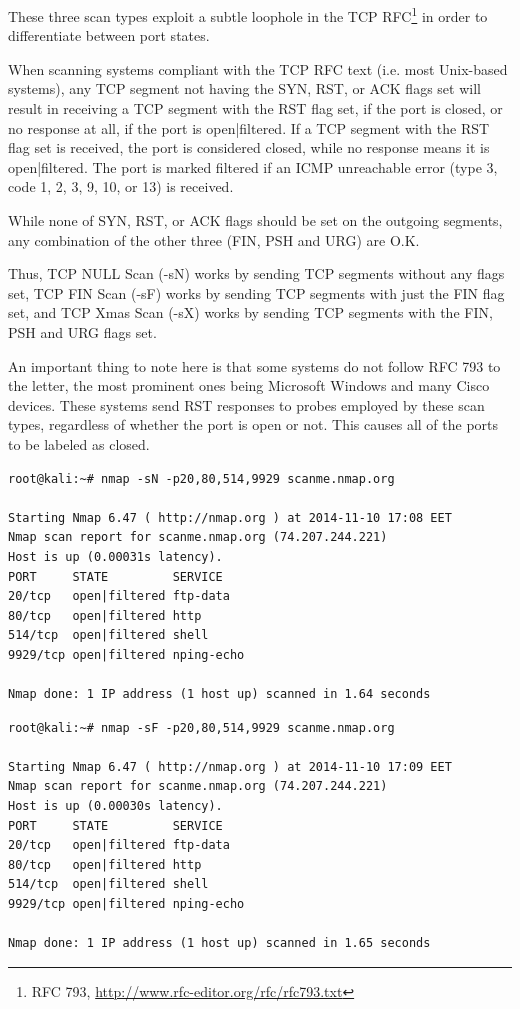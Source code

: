 \documentclass[a4paper,oneside,12pt]{book}
\begin{document}
These three scan types exploit a subtle loophole in the TCP RFC\footnote{RFC 793, \url{http://www.rfc-editor.org/rfc/rfc793.txt}} in order to differentiate between port states. 

When scanning systems compliant with the TCP RFC text (i.e. most Unix-based systems), any TCP segment not having the SYN, RST, or ACK flags set will result in receiving a TCP segment with the RST flag set, if the port is closed, or no response at all, if the port is open|filtered. If a TCP segment with the RST flag set is received, the port is considered closed, while no response means it is open|filtered. The port is marked filtered if an ICMP unreachable error (type 3, code 1, 2, 3, 9, 10, or 13) is received. 

While none of SYN, RST, or ACK flags should be set on the outgoing segments, any combination of the other three (FIN, PSH and URG) are O.K.

Thus, TCP NULL Scan (-sN) works by sending TCP segments without any flags set, TCP FIN Scan (-sF) works by sending TCP segments with just the FIN flag set, and TCP Xmas Scan (-sX) works by sending TCP segments with the FIN, PSH and URG flags set.

An important thing to note here is that some systems do not follow RFC 793 to the letter, the most prominent ones being Microsoft Windows and many Cisco devices. These systems send RST responses to probes employed by these scan types, regardless of whether the port is open or not. This causes all of the ports to be labeled as closed.

\begin{lstlisting}[title=A sample Nmap scan using the NULL Scan option]
root@kali:~# nmap -sN -p20,80,514,9929 scanme.nmap.org

Starting Nmap 6.47 ( http://nmap.org ) at 2014-11-10 17:08 EET
Nmap scan report for scanme.nmap.org (74.207.244.221)
Host is up (0.00031s latency).
PORT     STATE         SERVICE
20/tcp   open|filtered ftp-data
80/tcp   open|filtered http
514/tcp  open|filtered shell
9929/tcp open|filtered nping-echo

Nmap done: 1 IP address (1 host up) scanned in 1.64 seconds
\end{lstlisting}

\begin{lstlisting}[title=A sample Nmap scan using the FIN Scan option]
root@kali:~# nmap -sF -p20,80,514,9929 scanme.nmap.org

Starting Nmap 6.47 ( http://nmap.org ) at 2014-11-10 17:09 EET
Nmap scan report for scanme.nmap.org (74.207.244.221)
Host is up (0.00030s latency).
PORT     STATE         SERVICE
20/tcp   open|filtered ftp-data
80/tcp   open|filtered http
514/tcp  open|filtered shell
9929/tcp open|filtered nping-echo

Nmap done: 1 IP address (1 host up) scanned in 1.65 seconds
\end{lstlisting}
\end{document}
